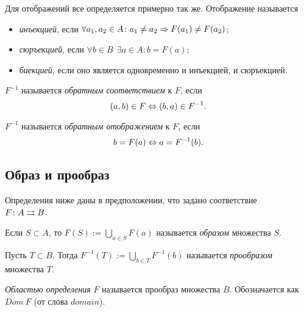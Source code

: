 
Для отображений все определяется примерно так же. Отображение называется
\begin{itemize}
	\item \textit{инъекцией}, если $\forall a_1, a_2 \in A \colon a_1 \neq a_2 \Rightarrow F(a_1) \neq F(a_2)$;
	\item \textit{сюръекцией}, если $\forall b \in B\ \ \exists a \in A \colon b = F(a)$;
	\item \textit{биекцией}, если оно является одновременно и инъекцией, и сюръекцией.
\end{itemize}

\begin{definition}
	$F^{-1}$ называется \textit{обратным соответствием} к $F$, если
	$$
		(a, b) \in F \Leftrightarrow (b, a) \in F^{-1}.
	$$
\end{definition}

\begin{definition}
		$F^{-1}$ называется \textit{обратным отображением} к $F$, если
	$$
		b = F(a) \Leftrightarrow a = F^{-1}(b).
	$$
\end{definition}

\subsection{Образ и прообраз}

\begin{note}
	Определения ниже даны в предположении, что задано соответствие \\ $F \colon A \rightrightarrows B$.
\end{note}

\begin{definition}
	Если $S \subset A$, то $F(S) := \bigcup\limits_{a \in S} F(a)$ называется \textit{образом} множества $S$.
\end{definition}

\begin{definition}
	Пусть $T \subset B$. Тогда $F^{-1}(T) := \bigcup\limits_{b \in T} F^{-1}(b)$ называется \textit{прообразом} множества $T$.
\end{definition}

\begin{definition}
	\textit{Областью определения} $F$ называется прообраз множества $B$. Обозначается как $Dom\ F$ (от слова $domain$).
\end{definition}

